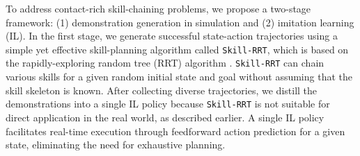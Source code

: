 


To address contact-rich skill-chaining problems, we propose a two-stage framework: (1) demonstration generation in simulation and (2) imitation learning (IL). In the first stage, we generate successful state-action trajectories using a simple yet effective skill-planning algorithm called \texttt{Skill-RRT}, which is based on the rapidly-exploring random tree (RRT) algorithm \cite{lavalle1998rapidly}. \texttt{Skill-RRT} can chain various skills for a given random initial state and goal without assuming that the skill skeleton is known. After collecting diverse trajectories, we distill the demonstrations into a single IL policy because \texttt{Skill-RRT} is not suitable for direct application in the real world, as described earlier. A single IL policy facilitates real-time execution through feedforward action prediction for a given state, eliminating the need for exhaustive planning.

